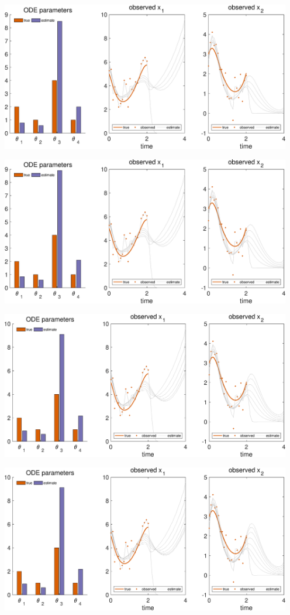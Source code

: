 {\includegraphics [width=5in]{VGM_for_Lotka_Volterra_06.eps}

\includegraphics [width=5in]{VGM_for_Lotka_Volterra_07.eps}

\includegraphics [width=5in]{VGM_for_Lotka_Volterra_08.eps}

\includegraphics [width=5in]{VGM_for_Lotka_Volterra_09.eps}

}

